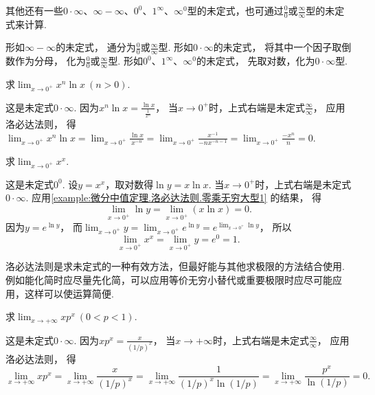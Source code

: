 其他还有一些\(0 \cdot \infty\)、\(\infty - \infty\)、\(0^0\)、\(1^\infty\)、\(\infty^0\)型的未定式，也可通过\(\frac{0}{0}\)或\(\frac{\infty}{\infty}\)型的未定式来计算.

形如\(\infty - \infty\)的未定式，
通分为\(\frac{0}{0}\)或\(\frac{\infty}{\infty}\)型.
形如\(0 \cdot \infty\)的未定式，
将其中一个因子取倒数作为分母，
化为\(\frac{0}{0}\)或\(\frac{\infty}{\infty}\)型.
形如\(0^0\)、\(1^\infty\)、\(\infty^0\)的未定式，
先取对数，化为\(0 \cdot \infty\)型.

\begin{example}\label{example:微分中值定理.洛必达法则.零乘无穷大型1}
求\(\lim_{x\to0^+} x^n \ln x\ (n > 0)\).
\begin{solution}
这是未定式\(0\cdot\infty\).
因为\(x^n \ln x = \frac{\ln x}{\frac{1}{x^n}}\)，
当\(x\to0^+\)时，上式右端是未定式\(\frac{\infty}{\infty}\)，
应用洛必达法则，
得\(\lim_{x\to0^+} x^n \ln x
= \lim_{x\to0^+} \frac{\ln x}{x^{-n}}
= \lim_{x\to0^+} \frac{x^{-1}}{-nx^{-n-1}}
= \lim_{x\to0^+} \frac{-x^n}{n}
= 0\).
\end{solution}
\end{example}

\begin{example}\label{example:微分中值定理.洛必达法则.零次方零型1}
求\(\lim_{x\to0^+}{x^x}\).
\begin{solution}
这是未定式\(0^0\).
设\(y = x^x\)，取对数得\(\ln y = x \ln x\).
当\(x\to0^+\)时，上式右端是未定式\(0\cdot\infty\).
应用\cref{example:微分中值定理.洛必达法则.零乘无穷大型1} 的结果，
得\[
	\lim_{x\to0^+} \ln y
	= \lim_{x\to0^+} (x \ln x) = 0.
\]
因为\(y = e^{\ln y}\)，
而\(\lim_{x\to0^+} y
= \lim_{x\to0^+} e^{\ln y}
= e^{\lim_{x\to0^+} \ln y}\)，
所以\[
	\lim_{x\to0^+} x^x
	= \lim_{x\to0^+} y
	= e^0
	= 1.
\]
\end{solution}
\end{example}

洛必达法则是求未定式的一种有效方法，但最好能与其他求极限的方法结合使用.
例如能化简时应尽量先化简，可以应用等价无穷小替代或重要极限时应尽可能应用，这样可以使运算简便.

\begin{example}\label{example:微分中值定理.洛必达法则.零乘无穷大型2}
求\(\lim_{x\to+\infty} x p^x\ (0<p<1)\).
\begin{solution}
这是未定式\(0\cdot\infty\).
因为\(x p^x =  \frac{x}{(1/p)^x}\)，
当\(x\to+\infty\)时，上式右端是未定式\(\frac{\infty}{\infty}\)，
应用洛必达法则，
得\[
	\lim_{x\to+\infty} x p^x
	= \lim_{x\to+\infty} \frac{x}{(1/p)^x}
	= \lim_{x\to+\infty} \frac{1}{(1/p)^x \ln(1/p)}
	= \lim_{x\to+\infty} \frac{p^x}{\ln(1/p)}
	= 0.
\]
\end{solution}
\end{example}

